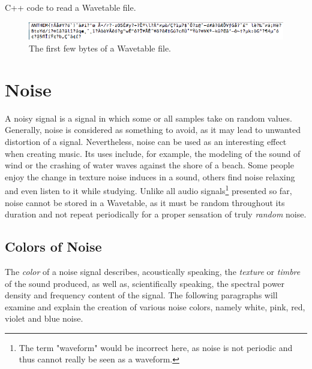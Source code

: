 \begin{table}[t!]
  \caption{C++ code to read a Wavetable file. }
  \label{code:wtfile}
\end{table}

\begin{figure}[h!]
  \includegraphics[scale=0.7]{img/wtfile}
  \caption{The first few bytes of a Wavetable file.}
  \label{fig:wtfile}
\end{figure}

\pagebreak

\section{Noise}

A noisy signal is a signal in which some or all samples take on random values. Generally, noise is considered as something to avoid, as it may lead to unwanted distortion of a signal. Nevertheless, noise can be used as an interesting effect when creating music. Its uses include, for example, the modeling of the sound of wind or the crashing of water waves against the shore of a beach. Some people enjoy the change in texture noise induces in a sound, others find noise relaxing and even listen to it while studying.  Unlike all audio signals\footnote{The term "waveform" would be incorrect here, as noise is not periodic and thus cannot really be seen as a waveform.} presented so far, noise cannot\footnotemark{} be stored in a Wavetable, as it must be random throughout its duration and not repeat periodically for a proper sensation of truly \emph{random} noise.


\subsection{Colors of Noise}

The \emph{color} of a noise signal describes, acoustically speaking, the \emph{texture} or \emph{timbre} \footnotemark{} of the sound produced, as well as, scientifically speaking, the spectral power density and frequency content of the signal. The following paragraphs will examine and explain the creation of various noise colors, namely white, pink, red, violet and blue noise.

